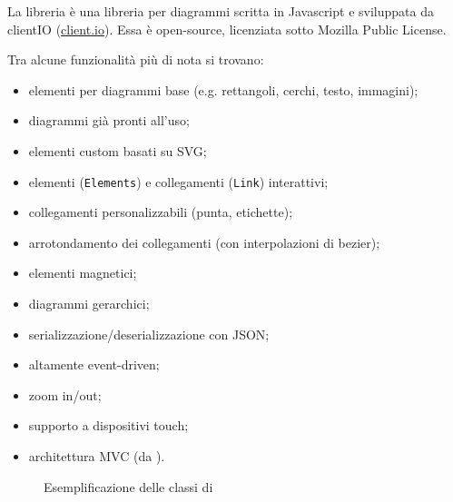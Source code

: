 La libreria \jointjs{} è una libreria per diagrammi scritta in Javascript e sviluppata da clientIO (\url{client.io}). Essa è open-source, licenziata sotto Mozilla Public License.

Tra alcune funzionalità più di nota si trovano:
\begin{itemize}
\item elementi per diagrammi base (e.g. rettangoli, cerchi, testo, immagini);
\item diagrammi già pronti all'uso;
\item elementi custom basati su SVG;
\item elementi (\texttt{Elements}) e collegamenti (\texttt{Link}) interattivi;
\item collegamenti personalizzabili (punta, etichette);
\item arrotondamento dei collegamenti (con interpolazioni di bezier);
\item elementi magnetici;
\item diagrammi gerarchici;
\item serializzazione/deserializzazione con JSON;
\item altamente event-driven;
\item zoom in/out;
\item supporto a dispositivi touch;
\item architettura MVC (da \backbonejs).

\end{itemize}


\begin{figure}[H]
\caption{Esemplificazione delle classi di \jointjs{}}

\end{figure}

